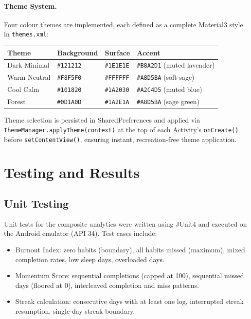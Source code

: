 \documentclass[12pt,a4paper]{article}
\begin{document}
\paragraph{Theme System.}
Four colour themes are implemented, each defined as a complete Material3
style in \texttt{themes.xml}:

\begin{center}
\begin{tabular}{llll}
\toprule
\textbf{Theme} & \textbf{Background} & \textbf{Surface} & \textbf{Accent} \\
\midrule
Dark Minimal & \texttt{\#121212} & \texttt{\#1E1E1E} & \texttt{\#B8A2D1} (muted lavender) \\
Warm Neutral & \texttt{\#F8F5F0} & \texttt{\#FFFFFF} & \texttt{\#A8D5BA} (soft sage) \\
Cool Calm    & \texttt{\#101820} & \texttt{\#1A2030} & \texttt{\#A2C4D5} (muted blue) \\
Forest       & \texttt{\#0D1A0D} & \texttt{\#1A2E1A} & \texttt{\#A8D5BA} (sage green) \\
\bottomrule
\end{tabular}
\end{center}

Theme selection is persisted in SharedPreferences and applied via
\texttt{ThemeManager.applyTheme(context)} at the top of each Activity's
\texttt{onCreate()} before \texttt{setContentView()}, ensuring instant,
recreation-free theme application.

\section{Testing and Results}

\subsection{Unit Testing}

Unit tests for the composite analytics were written using JUnit4 and executed
on the Android emulator (API 34). Test cases include:

\begin{itemize}[leftmargin=1.5em]
    \item Burnout Index: zero habits (boundary), all habits missed (maximum), mixed
    completion rates, low sleep days, overloaded days.
    \item Momentum Score: sequential completions (capped at 100), sequential missed
    days (floored at 0), interleaved completion and miss patterns.
    \item Streak calculation: consecutive days with at least one log, interrupted
    streak resumption, single-day streak boundary.
\end{itemize}
\end{document}
